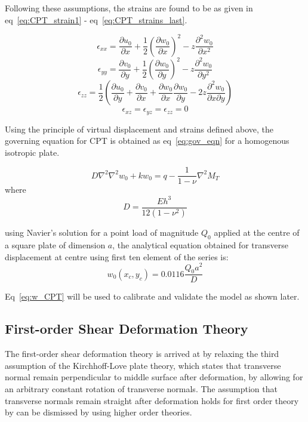 Following these assumptions, the strains are found to be as given in eq~\ref{eq:CPT_strain1} - eq~\ref{eq:CPT_strains_last}.

\begin{equation}
    \epsilon_{xx} = \frac{\partial u_0}{\partial x} + \frac{1}{2}(\frac{\partial w_0}{\partial x})^2 - z\frac{\partial^2 w_0}{\partial x^2}
    \label{eq:CPT_strain1}
\end{equation}
\begin{equation}
    \epsilon_{yy} = \frac{\partial v_0}{\partial y} + \frac{1}{2}(\frac{\partial w_0}{\partial y})^2 - z\frac{\partial^2 w_0}{\partial y^2}
\end{equation}
\begin{equation}
    \epsilon_{zz} = \frac{1}{2}(\frac{\partial u_0}{\partial y} + \frac{\partial v_0}{\partial x} + \frac{\partial w_0}{\partial x}\frac{\partial w_0}{\partial y} - 2z\frac{\partial^2 w_0}{\partial x\partial y})
\end{equation}
\begin{equation}
    \epsilon_{xz} = \epsilon_{yz} = \epsilon_{zz} = 0
    \label{eq:CPT_strains_last}
\end{equation}

Using the principle of virtual displacement and strains defined above, the governing equation for CPT is obtained as eq~\ref{eq:gov_eqn} for a homogenous isotropic plate.

\begin{equation}
    \label{eq:gov_eqn}
    D\nabla^2\nabla^2 w_0 + kw_0 = q - \frac{1}{ 1 - \nu}\nabla^2 M_T
\end{equation}
where\\
\begin{equation}
    D = \frac{Eh^3}{12(1 - \nu^2)}
    \label{eq:D}
\end{equation}

using Navier's solution for a point load of magnitude $Q_0$ applied at the centre of a square plate of dimension $a$, the analytical equation obtained for transverse displacement at centre using first ten element of the series is:
\begin{equation}
    w_0(x_c, y_c) = 0.0116\frac{Q_0a^2}{D}
    \label{eq:w_CPT}
\end{equation}

Eq~\ref{eq:w_CPT} will be used to calibrate and validate the model as shown later.

\subsection{First-order Shear Deformation Theory}
The first-order shear deformation theory is arrived at by relaxing the third assumption of the Kirchhoff-Love plate theory, which states that transverse normal remain perpendicular to middle surface after deformation, by allowing for an arbitrary constant rotation of transverse normals. The assumption that transverse normals remain straight after deformation holds for first order theory by can be dismissed by using higher order theories.


